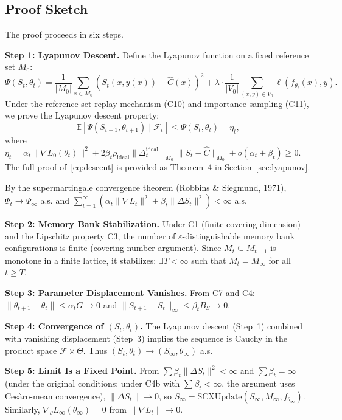\documentclass[11pt,a4paper]{article}
\theoremstyle{plain}
\theoremstyle{definition}
\theoremstyle{remark}
\newcommand{\E}{\mathbb{E}}
\newcommand{\F}{\mathcal{F}}
\begin{document}
\subsection{Proof Sketch}

The proof proceeds in six steps.

\textbf{Step 1: Lyapunov Descent.} Define the Lyapunov function on a fixed reference set $M_0$:
\begin{equation}\label{eq:lyapunov}
    \Psi(S_t, \theta_t) = \frac{1}{|M_0|} \sum_{x \in M_0} (S_t(x, y(x)) - \hat{C}(x))^2 + \lambda \cdot \frac{1}{|V_0|} \sum_{(x,y) \in V_0} \ell(f_{\theta_t}(x), y).
\end{equation}
Under the reference-set replay mechanism (C10) and importance sampling (C11), we prove the Lyapunov descent property:
\begin{equation}\label{eq:descent}
    \E[\Psi(S_{t+1}, \theta_{t+1}) \mid \F_t] \leq \Psi(S_t, \theta_t) - \eta_t,
\end{equation}
where $\eta_t = \alpha_t \|\nabla L_0(\theta_t)\|^2 + 2\beta_t \rho_{\text{ideal}} \|\Delta_t^{\text{ideal}}\|_{M_0} \|S_t - \hat{C}\|_{M_0} + o(\alpha_t + \beta_t) \geq 0$. The full proof of~\eqref{eq:descent} is provided as Theorem~4 in Section~\ref{sec:lyapunov}.

By the supermartingale convergence theorem (Robbins \& Siegmund, 1971), $\Psi_t \to \Psi_\infty$ a.s. and $\sum_{t=1}^\infty (\alpha_t \|\nabla L_t\|^2 + \beta_t \|\Delta S_t\|^2) < \infty$ a.s.

\textbf{Step 2: Memory Bank Stabilization.} Under C1 (finite covering dimension) and the Lipschitz property C3, the number of $\varepsilon$-distinguishable memory bank configurations is finite (covering number argument). Since $M_t \subseteq M_{t+1}$ is monotone in a finite lattice, it stabilizes: $\exists T < \infty$ such that $M_t = M_\infty$ for all $t \geq T$.

\textbf{Step 3: Parameter Displacement Vanishes.} From C7 and C4: $\|\theta_{t+1} - \theta_t\| \leq \alpha_t G \to 0$ and $\|S_{t+1} - S_t\|_\infty \leq \beta_t B_S \to 0$.

\textbf{Step 4: Convergence of $(S_t, \theta_t)$.} The Lyapunov descent (Step~1) combined with vanishing displacement (Step~3) implies the sequence is Cauchy in the product space $\F \times \Theta$. Thus $(S_t, \theta_t) \to (S_\infty, \theta_\infty)$ a.s.

\textbf{Step 5: Limit Is a Fixed Point.} From $\sum \beta_t \|\Delta S_t\|^2 < \infty$ and $\sum \beta_t = \infty$ (under the original conditions; under C4b with $\sum \beta_t < \infty$, the argument uses Ces\`{a}ro-mean convergence), $\|\Delta S_t\| \to 0$, so $S_\infty = \text{SCXUpdate}(S_\infty, M_\infty, f_{\theta_\infty})$. Similarly, $\nabla_\theta L_\infty(\theta_\infty) = 0$ from $\|\nabla L_t\| \to 0$.
\end{document}
